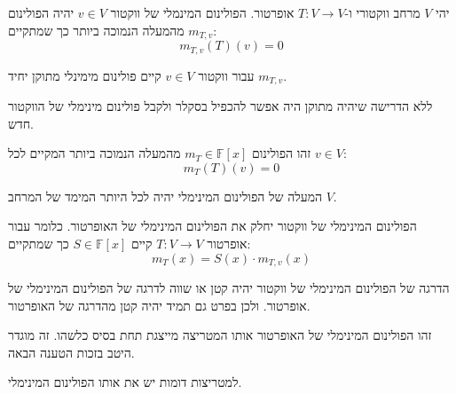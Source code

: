 \documentclass{tstextbook}
\begin{document}
\begin{definition}
יהי \(V\) מרחב ווקטורי ו-\(T:V\to V\) אופרטור. הפולינום המינמלי של ווקטור \(v \in V\) יהיה הפולינום \(m_{T,v}\) מהמעלה הנמוכה ביותר כך שמתקיים:
$$m_{T,v}(T)(v)=0$$

\end{definition}
\begin{proposition}
עבור ווקטור \(v\in V\) קיים פולינום מימינלי מתוקן יחיד \(m_{T,v}\).

\end{proposition}
\begin{remark}
ללא הדרישה שיהיה מתוקן היה אפשר להכפיל בסקלר ולקבל פולינום מינימלי של הווקטור חדש.

\end{remark}
\begin{definition}
זהו הפולינום \(m_{T} \in \mathbb{F} [x]\) מהמעלה הנמוכה ביותר המקיים לכל \(v \in V\):
$$m_{T}(T)(v)=0$$

\end{definition}
\begin{proposition}
המעלה של הפולינום המינימלי יהיה לכל היותר המימד של המרחב \(V\).

\end{proposition}
\begin{proposition}
הפולינום המינימלי של ווקטור יחלק את הפולינום המינימלי של האופרטור. כלומר עבור אופרטור \(T:V\to V\)  קיים \(S \in \mathbb{F} [x]\) כך שמתקיים:
$$m_{T}(x)=S(x)\cdot m_{T,v}(x)$$

\end{proposition}
\begin{corollary}
הדרגה של הפולינום המינימלי של ווקטור יהיה קטן או שווה לדרגה של הפולינום המינימלי של אופרטור. ולכן בפרט גם תמיד יהיה קטן מהדרגה של האופרטור.

\end{corollary}
\begin{definition}
זהו הפולינום המינימלי של האופרטור אותו המטריצה מייצגת תחת בסיס כלשהו. זה מוגדר היטב בזכות הטענה הבאה.

\end{definition}
\begin{proposition}
למטריצות דומות יש את אותו הפולינום המינימלי.

\end{proposition}
\end{document}
